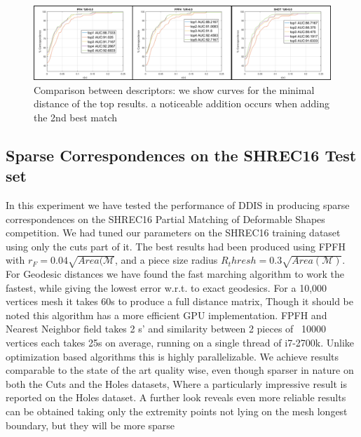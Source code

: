 \documentclass[10pt,twocolumn,letterpaper]{article}
\begin{document}
\begin{figure}[htb]
	\centering

	\includegraphics[width=1\textwidth]{figures/ROCfigure.png}
	\caption{Comparison between descriptors: we show curves for the minimal distance of the top results. a noticeable addition occurs when adding the 2nd best match}
\end{figure}

\subsection{Sparse Correspondences on the SHREC16 Test set}
In this experiment we have tested the performance of DDIS in producing sparse correspondences on the SHREC16 Partial Matching of Deformable Shapes competition. 
We had tuned our parameters on the SHREC16 training dataset using only the cuts part of it. The best results had been produced using FPFH with $r_F = 0.04\sqrt{Area(\mathcal{M}}$, and a piece size radius $R_thresh=0.3\sqrt{Area(\mathcal{M})}$. For Geodesic distances we have found the fast marching algorithm to work the fastest, while giving the lowest error w.r.t. to exact geodesics. For a 10,000 vertices mesh it takes 60s to produce a full distance matrix, Though it should be noted this algorithm has a more efficient GPU implementation. FPFH and Nearest Neighbor field takes 2 s' and similarity between 2 pieces of ~10000 vertices each takes 25s on average, running on a single thread of i7-2700k. Unlike optimization based algorithms this is highly parallelizable.
We achieve results comparable to the state of the art \cite{litany2017fully} quality wise, even though sparser in nature on both the Cuts and the Holes datasets, Where a particularly impressive result is reported on the Holes dataset. A further look reveals even more reliable results can be obtained taking only the extremity points not lying on the mesh longest boundary, but they will be more sparse
\end{document}
